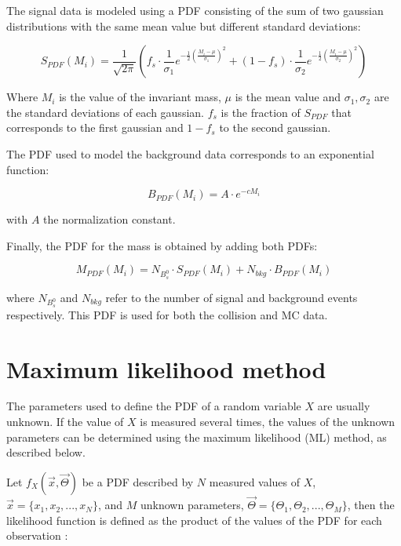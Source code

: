 The signal data is modeled using a PDF consisting of the sum of two gaussian distributions with the same mean value but different standard deviations:

\begin{equation}
	\label{eq:sigpdf}
S_{PDF}(M_i) = \frac{1}{\sqrt{2\pi}} \left(f_s \cdot \frac{1}{\sigma_1}e^{-\frac{1}{2}\left(\frac{M_i-\mu}{\sigma_1}\right)^2} + (1 - f_s) \cdot \frac{1}{\sigma_2}e^{-\frac{1}{2}\left(\frac{M_i-\mu}{\sigma_2}\right)^2}\right)
\end{equation}

Where $M_i$ is the value of the invariant mass, $\mu$ is the mean value and $\sigma_1, \sigma_2$ are the standard deviations of each gaussian. $f_s$ is the fraction of $S_{PDF}$ that corresponds to the first gaussian and $1-f_s$ to the second gaussian. 

The PDF used to model the background data corresponds to an exponential function:

\begin{equation}
B_{PDF}(M_i) = A \cdot e^{-cM_i}
\end{equation}

with $A$ the normalization constant. 

Finally, the PDF for the mass is obtained by adding both PDFs:

\begin{equation}
M_{PDF}(M_i) = N_{B^0_s}\cdot S_{PDF}(M_i)  + N_{bkg} \cdot B_{PDF}(M_i)
\label{eq:masspdf}
\end{equation}

where $N_{B^0_s}$ and $N_{bkg}$ refer to the number of signal and background events respectively. This PDF is used for both the collision and MC data.

\section{Maximum likelihood method}
\label{mlmethod}
The parameters used to define the PDF of a random variable $X$ are usually unknown. If the value of $X$ is measured several times, the values of the unknown parameters can be determined using the maximum likelihood (ML) method, as described below.

Let $f_X(\vec{x}, \vec{\Theta} )$ be a PDF described by $N$ measured values of $X$, $\vec{x} = \{x_1, x_2, ..., x_N\}$, and $M$ unknown parameters, $\vec{\Theta} = \{\Theta_1, \Theta_2, ..., \Theta_M \}$, then the likelihood function is defined as the product of the values of the PDF for each observation \cite{bonanomi2021response,vsirca2016probability}:


